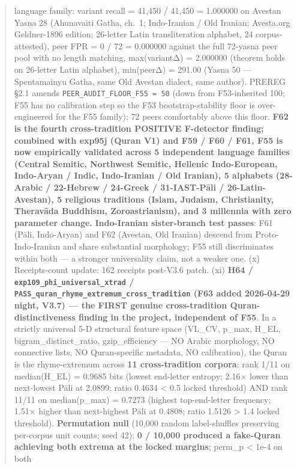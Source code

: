 \documentclass[
]{article}
\begin{document}
\begin{quote}
language family: variant recall = 41,450 / 41,450 = 1.000000 on Avestan
Yasna 28 (Ahunavaiti Gatha, ch.~1; Indo-Iranian / Old Iranian;
Avesta.org Geldner-1896 edition; 26-letter Latin transliteration
alphabet, 24 corpus-attested), peer FPR = 0 / 72 = 0.000000 against the
full 72-yasna peer pool with no length matching, max(variantΔ) =
2.000000 (theorem holds on 26-letter Latin alphabet), min(peerΔ) =
291.00 (Yasna 50 --- Spentamainyu Gatha, same Old Avestan dialect, same
author). PREREG §2.1 amends \texttt{PEER\_AUDIT\_FLOOR\_F55\ =\ 50}
(down from F53-inherited 100; F55 has no calibration step so the F53
bootstrap-stability floor is over-engineered for the F55 family); 72
peers comfortably above this floor. \textbf{F62 is the fourth
cross-tradition POSITIVE F-detector finding; combined with exp95j (Quran
V1) and F59 / F60 / F61, F55 is now empirically validated across 5
independent language families (Central Semitic, Northwest Semitic,
Hellenic Indo-European, Indo-Aryan / Indic, Indo-Iranian / Old Iranian),
5 alphabets (28-Arabic / 22-Hebrew / 24-Greek / 31-IAST-Pāli /
26-Latin-Avestan), 5 religious traditions (Islam, Judaism, Christianity,
Theravāda Buddhism, Zoroastrianism), and 3 millennia with zero parameter
change.} \textbf{Indo-Iranian sister-branch test passes}: F61 (Pāli,
Indo-Aryan) and F62 (Avestan, Old Iranian) descend from
Proto-Indo-Iranian and share substantial morphology; F55 still
discriminates within both --- a stronger universality claim, not a
weaker one. (x) Receipts-count update: 162 receipts post-V3.6 patch.
(xi) \textbf{H64 / \texttt{exp109\_phi\_universal\_xtrad} /
\texttt{PASS\_quran\_rhyme\_extremum\_cross\_tradition} (F63 added
2026-04-29 night, V3.7) --- the FIRST genuine cross-tradition
Quran-distinctiveness finding in the project, independent of F55}. In a
strictly universal 5-D structural feature space (VL\_CV, p\_max, H\_EL,
bigram\_distinct\_ratio, gzip\_efficiency --- NO Arabic morphology, NO
connective lists, NO Quran-specific metadata, NO calibration), the Quran
is the rhyme-extremum across \textbf{11 cross-tradition corpora}: rank
1/11 on median(H\_EL) = 0.9685 bits (lowest end-letter entropy; 2.16×
lower than next-lowest Pāli at 2.0899; ratio 0.4634 \textless{} 0.5
locked threshold) AND rank 11/11 on median(p\_max) = 0.7273 (highest
top-end-letter frequency; 1.51× higher than next-highest Pāli at 0.4808;
ratio 1.5126 \textgreater{} 1.4 locked threshold). \textbf{Permutation
null} (10,000 random label-shuffles preserving per-corpus unit counts;
seed 42): \textbf{0 / 10,000 produced a fake-Quran achieving both
extrema at the locked margins}; perm\_p \textless{} 1e-4 on both

\end{quote}
\end{document}

